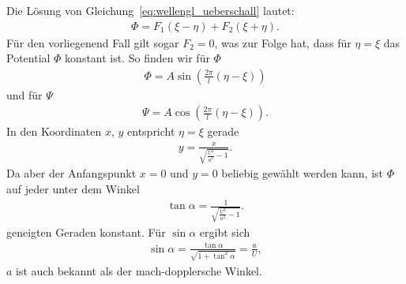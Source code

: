 Die Lösung von Gleichung~\eqref{eq:wellengl_ueberschall} lautet:
\begin{align*}
    \Phi
    =
    F_1(\xi-\eta)
    +
    F_2(\xi+\eta).
\end{align*}
Für den vorliegenend Fall gilt sogar $F_2 = 0$, 
was zur Folge hat, dass für $\eta = \xi$ das Potential
$\Phi$ konstant ist.
So finden wir für $\Phi$
\begin{align*}
    \Phi
    =
    A \sin\left(
        \frac{2\pi}{l}
        (\eta-\xi)
    \right)
\end{align*}
und für $\Psi$
\begin{align*}
    \Psi
    =
    A \cos\left(
        \frac{2\pi}{l}
        (\eta-\xi)
    \right).
\end{align*}
In den Koordinaten $x$, $y$ entspricht $\eta = \xi$ gerade 
\begin{align*}
    y
    =
    \frac{x}{\sqrt{\frac{U^2}{a^2}-1}}.
\end{align*} 
Da aber der Anfangspunkt $x = 0$ und $y = 0$ beliebig gewählt
werden kann, ist $\Phi$ auf jeder unter dem Winkel
\begin{align*}
    \tan \alpha
    =
    \frac{1}{\sqrt{\frac{U^2}{a^2}-1}}.
\end{align*}
geneigten Geraden konstant.
Für $\sin \alpha$ ergibt sich
\begin{align*}
    \sin \alpha
    =
    \frac{\tan \alpha}{\sqrt{1 + \tan^2 \alpha}}
    =
    \frac{a}{U},
\end{align*}
$a$ ist auch bekannt als der mach-dopplersche Winkel.

